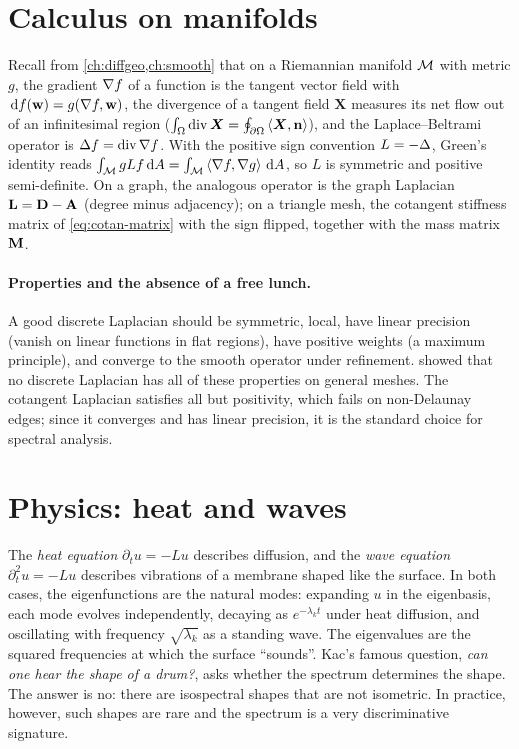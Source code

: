 \section{Calculus on manifolds}

Recall from \cref{ch:diffgeo,ch:smooth} that on a Riemannian manifold $\mathcal{M}$ with metric $g$, the
gradient $\nabla f$ of a function is the tangent vector field with $\,\mathrm{d} f(\mathbf{w})=g(\nabla f,\mathbf{w})$, the
divergence of a tangent field $\bm X$ measures its net flow out of an infinitesimal region
($\int_\Omega\operatorname{div}\bm X=\oint_{\partial\Omega}\left\langle \bm X,\mathbf{n}\right\rangle$), and the Laplace--Beltrami operator is
$\Delta f=\operatorname{div}\nabla f$. With the positive sign convention $L=-\Delta$, Green's identity reads
$\int_{\mathcal{M}} gLf\,\mathrm{d} A=\int_{\mathcal{M}}\left\langle \nabla f,\nabla g\right\rangle\,\mathrm{d} A$, so $L$ is symmetric and positive
semi-definite. On a graph, the analogous operator is the graph Laplacian $\mathbf{L}=\mathbf{D}-\mathbf{A}$ (degree minus
adjacency); on a triangle mesh, the cotangent stiffness matrix of \eqref{eq:cotan-matrix} with the sign
flipped, together with the mass matrix $\mathbf{M}$.

\paragraph{Properties and the absence of a free lunch.} A good discrete Laplacian should be
symmetric, local, have linear precision (vanish on linear functions in flat regions), have positive
weights (a maximum principle), and converge to the smooth operator under refinement.
\citet{Wardetzky2007} showed that no discrete Laplacian has all of these properties on general
meshes. The cotangent Laplacian satisfies all but positivity, which fails on non-Delaunay edges;
since it converges and has linear precision, it is the standard choice for spectral analysis.

\section{Physics: heat and waves}

The \emph{heat equation} $\partial_tu=-Lu$ describes diffusion, and the \emph{wave equation}
$\partial_t^2u=-Lu$ describes vibrations of a membrane shaped like the surface. In both cases, the
eigenfunctions are the natural modes: expanding $u$ in the eigenbasis, each mode evolves
independently, decaying as $e^{-\lambda_kt}$ under heat diffusion, and oscillating with frequency
$\sqrt{\lambda_k}$ as a standing wave. The eigenvalues are the squared frequencies at which the surface
``sounds''. Kac's famous question, \emph{can one hear the shape of a drum?}, asks whether the
spectrum determines the shape. The answer is no: there are isospectral shapes that are not isometric.
In practice, however, such shapes are rare and the spectrum is a very discriminative signature.

